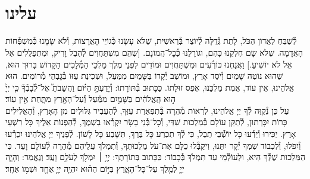 \documentclass[twoside, openany, parskip=half, 11pt]{book}
\begin{document}
\uvaletzion

\\
\\


\label{end of shacharis}
\fullkaddish

\section[עלינו]{ עלינו }

\newcommand{\aleinu}{
\firstword{עָלֵֽינוּ}
לְ֯שַׁבֵּחַ לַאֲדוֹן הַכֹּל, לָתֵת גְּ֯דֻלָּה לְ֯יוֹצֵר בְּ֯רֵאשִׁית, שֶׁלֹּא עָשָׂנוּ כְּ֯גוֹיֵי הָאֲרָצוֹת, וְ֯לֹא שָׂמָנוּ כְּ֯מִשְׁפְּ֯חוֹת הָאֲדָמָה. שֶׁלֹּא שָׂם חֶלְקֵנוּ כָּהֶם, וגוֹרָלֵנוּ כְּ֯כׇל־הֲמוֹנָם. [שֶׁהֵם מִשְׁתַּחֲוִים לְ֯הֶבֶל וָרִיק, וּמִתְפַּלֲּלִים אֶל אֵל לֹא יוֹשִׁיעַ.] וַאֲנַחְנוּ כּוֹרְ֯עִים וּמִשְׁתַּחֲוִים וּמוֹדִים לִפְנֵי מֶלֶךְ מַלְכֵי הַמְּ֯לָכִים הַקָּדוֹשׁ בָּרוּךְ הוּא, שֶׁהוּא נוֹטֶה שָׁמַיִם וְ֯יֹסֵד אָרֶץ, וּמוֹשַׁב יְ֯קָרוֹ בַּשָּׁמַיִם מִמַּעַל, וּשְׁכִינַת עֻזּוֹ בְּ֯גׇבְהֵי מְ֯רוֹמִים. הוּא אֱלֹהֵינוּ, אֵין עוֹד, אֱמֶת מַלְכֵּנוּ, אֶפֶס זוּלָתוֹ. כַּכָּתוּב בְּ֯תּוֹרָתוֹ: וְ֯יָדַעְתָּ֣
\source{דברים ד}
הַיּ֗וֹם וַהֲשֵׁבֹתָ֮ אֶל־לְ֯בָבֶ֒ךָ֒ כִּ֤י יְיָ֙ ה֣וּא הָֽאֱלֹהִ֔ים בַּשָּׁמַ֣יִם מִמַּ֔עַל וְ֯עַל־הָאָ֖רֶץ מִתָּ֑חַת אֵ֖ין עֽוֹד׃\\
עַל כֵּן נְ֯קַוֶּה לְ֯ךָ יְיָ אֱלֹהֵינוּ, לִרְאוֹת מְ֯הֵרָה בְּ֯תִפְאֶרֶת עֻזֶּךָ, לְ֯הַעֲבִיר גִּלּוּלִים מִן הָאָרֶץ, וְ֯הָאֱלִילִים כָּרוֹת יִכָּרֵתוּן, לְ֯תַקֵּן עוֹלָם בְּ֯מַלְכוּת שַׁדַּי, וְ֯כׇל־בְּ֯נֵי בָשָׂר יִקְרְ֯אוּ בִשְׁמֶךָ, לְ֯הַפְנוֹת אֵלֶיךָ כָּל רִשְׁעֵי אָרֶץ. יַכִּירוּ וְ֯יֵדְ֯עוּ כָּל יוֹשְׁ֯֯בֵי תֵבֵל, כִּי לְ֯ךָ תִכְרַע כָּל בֶּרֶךְ, תִּשָּׁבַע כָּל לָשׁוֹן. לְ֯פָנֶיךָ יְיָ אֱלֹהֵינוּ יִכְרְ֯עוּ וְ֯יִפֹּלוּ, וְ֯לִכְבוֹד שִׁמְךָ יְ֯קָר יִתֵּנוּ, \adforn{14} וִיקַבְּ֯לוּ כֻלָּם אֶת־עֹל מַלְכוּתֶךָ, וְ֯תִמְלֹךְ עֲלֵיהֶם מְ֯הֵרָה לְ֯עוֹלָם וָעֶד. כִּי הַמַּלְכוּת שֶׁלְּ֯ךָ הִיא, וּלְעוֹלְ֯מֵי עַד תִּמְלֹךְ בְּ֯כָבוֹד: כַּכָּתוּב בְּתוֹרָתֶךָ:\source{שמות טו} יְיָ֥ ׀ יִמְלֹ֖ךְ לְעֹלָ֥ם וָעֶֽד׃ וְנֶאֱמַר:\source{זכריה יד} וְהָיָ֧ה יְיָ֛ לְמֶ֖לֶךְ עַל־כׇּל־הָאָ֑רֶץ בַּיּ֣וֹם הַה֗וּא יִהְיֶ֧ה יְיָ֛ אֶחָ֖ד וּשְׁמ֥וֹ אֶחָֽד׃
}

\aleinu
\end{document}
